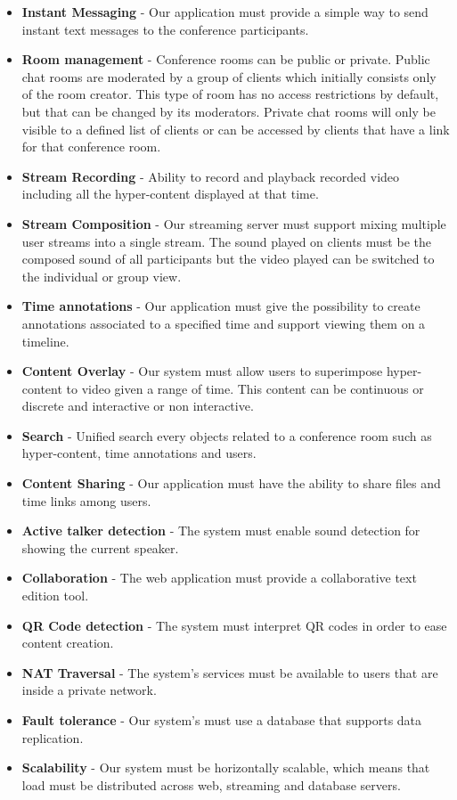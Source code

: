 \begin{itemize}
 \item \textbf{Instant Messaging} - Our application must provide a simple way to send instant text messages to the conference participants.
 \item \textbf{Room management} - Conference rooms can be public or private. Public chat rooms are moderated by a group of clients which initially consists only of the room creator. This type of room has no access restrictions by default, but that can be changed by its moderators. Private chat rooms will only be visible to a defined list of clients or can be accessed by clients that have a link for that conference room.
 \item \textbf{Stream Recording} - Ability to record and playback recorded video including all the hyper-content displayed at that time.
 \item \textbf{Stream Composition} - Our streaming server must support mixing multiple user streams into a single stream. The sound played on clients must be the composed sound of all participants but the video played can be switched to the individual or group view.
 \item \textbf{Time annotations} - Our application must give the possibility to create annotations associated to a specified time and support viewing them on a timeline. 
 \item \textbf{Content Overlay} - Our system must allow users to superimpose hyper-content to video given a range of time. This content can be continuous or discrete and interactive or non interactive.
 \item \textbf{Search} - Unified search every objects related to a conference room such as hyper-content, time annotations and users.
 \item \textbf{Content Sharing} - Our application must have the ability to share files and time links among users.
 \item \textbf{Active talker detection} - The system must enable sound detection for showing the current speaker.
 \item \textbf{Collaboration} - The web application must provide a collaborative text edition tool.
 \item \textbf{QR Code detection} - The system must interpret \ac{QR} codes in order to ease content creation.
 \item \textbf{NAT Traversal} - The system's services must be available to users that are inside a private network.
 \item \textbf{Fault tolerance} - Our system's must use a database that supports data replication.
 \item \textbf{Scalability} - Our system must be horizontally scalable, which means that load must be distributed across web, streaming and database servers.
\end{itemize}

